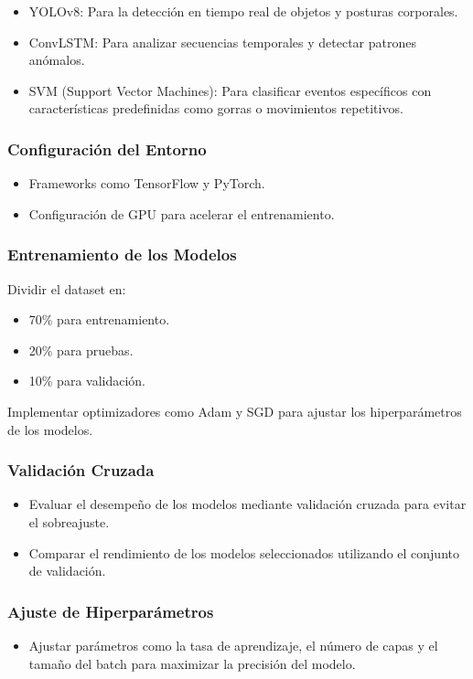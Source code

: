 \documentclass[listof=nochaptergap,12pt,times,authoryear]{report}
\begin{document}
\begin{itemize}
    \item YOLOv8: Para la detección en tiempo real de objetos y posturas corporales.
    \item ConvLSTM: Para analizar secuencias temporales y detectar patrones anómalos.
    \item SVM (Support Vector Machines): Para clasificar eventos específicos con características predefinidas como gorras o movimientos repetitivos.
\end{itemize}


\subsubsection{Configuración del Entorno}
\begin{itemize}
    \item Frameworks como TensorFlow y PyTorch.
    \item Configuración de GPU para acelerar el entrenamiento.
\end{itemize}


\subsubsection{Entrenamiento de los Modelos}
Dividir el dataset en:
\begin{itemize}
    \item 70\% para entrenamiento.
    \item 20\% para pruebas.
    \item 10\% para validación.
\end{itemize}

Implementar optimizadores como Adam y SGD para ajustar los hiperparámetros de los modelos.

\subsubsection{Validación Cruzada}
\begin{itemize}
    \item Evaluar el desempeño de los modelos mediante validación cruzada para evitar el sobreajuste.
    \item Comparar el rendimiento de los modelos seleccionados utilizando el conjunto de validación.
\end{itemize}

\subsubsection{Ajuste de Hiperparámetros}
\begin{itemize}
    \item Ajustar parámetros como la tasa de aprendizaje, el número de capas y el tamaño del batch para maximizar la precisión del modelo.
\end{itemize}
\end{document}
